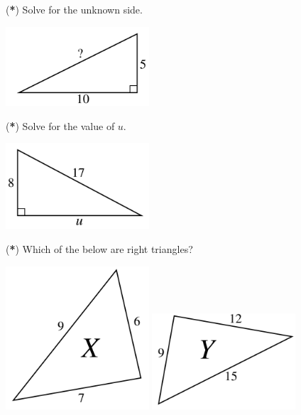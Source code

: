 \documentclass[addpoints,12pt]{exam}
\begin{document}
\begin{questions}
\question
(\textbf{*})
Solve for the unknown side.

\includegraphics[width=0.4\textwidth]{../images/d1.png}

\vspace{0.3in}




\question
(\textbf{*})
Solve for the value of $u$.

\includegraphics[width=0.4\textwidth]{../images/d3.png}

\vspace{0.3in}


\question
(\textbf{*})
Which of the below are right triangles?

\includegraphics[width=0.4\textwidth]{../images/d4.png}
\hspace{0.2\textwidth}
\includegraphics[width=0.4\textwidth]{../images/d5.png}


\end{questions}
\end{document}

